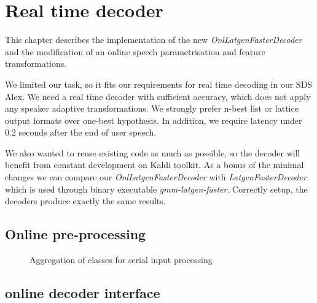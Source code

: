 \chapter{Real time decoder}
\label{cha:decoder}

This chapter describes the implementation
of the new {\it OnlLatgenFasterDecoder}\/ and 
the modification of an online speech parametrisation and feature transformations.

We limited our task, so it fits our requirements for real time decoding
in our \ac{SDS} Alex.
We need a real time decoder with sufficient accuracy,
which does not apply any speaker adaptive transformations.
We strongly prefer n-best list or lattice output formats over one-best hypothesis.
In addition, we require latency under 0.2 seconds after the end of user speech.

We also wanted to reuse existing code as much as possible,
so the decoder will benefit from constant development on Kaldi toolkit.
As a bonus of the minimal changes we can compare our {\it OnlLatgenFasterDecoder}\/ 
with {\it LatgenFasterDecoder}\/ which is used through binary executable {\it gmm-latgen-faster}.
Correctly setup, the decoders produce exactly the same results.








\section{Online pre-processing} 
\label{sec:onl_preprocess}

\begin{figure}[!ph]
    \begin{center}
        
    \caption{Aggregation of classes for serial input processing}
    \label{fig:classes} 
    \end{center}
\end{figure}


\section{online decoder interface} 
\label{sec:improve}

